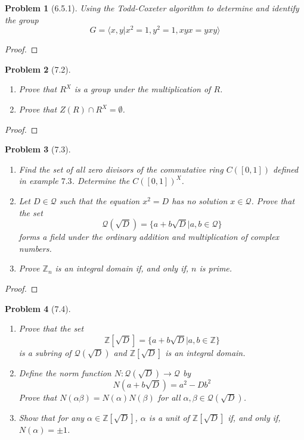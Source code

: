 \documentclass[10pt]{article}
\newcommand{\sk}{\vskip 10mm}
\newcommand{\bb}[1]{\mathbb{#1}}
\theoremstyle{plain}
\newtheorem{problem}{Problem}
\theoremstyle{remark}
\begin{document}
\begin{problem}[6.5.1]
  Using the Todd-Coxeter algorithm to determine and identify the group
  \[ G = \langle x,y| x^2=1,y^2=1, xyx=yxy\rangle \]
\end{problem}

\begin{proof}
  
\end{proof}

\sk

\begin{problem}[7.2]
  \begin{enumerate}
  \item Prove that $R^X$ is a group under the multiplication of $R$.
  \item Prove that $Z(R)\cap R^X=\emptyset$.
  \end{enumerate}
\end{problem}

\begin{proof}
  
\end{proof}

\sk

\begin{problem}[7.3]
  \begin{enumerate}
  \item Find the set of all zero divisors of the commutative ring $C([0,1])$
    defined in example $7.3$. Determine the $C([0,1])^X$.
  \item Let $D\in\mathcal{Q}$ such that the equation $x^2=D$ has no solution
    $x\in\mathcal{Q}$. Prove that the set
    \[ \mathcal{Q}(\sqrt{D})=\{a+b\sqrt{D}|a,b\in\mathcal{Q}\}\]
    forms a field under the ordinary addition and multiplication of
    complex numbers.
   \item Prove $\bb{Z}_n$ is an integral domain if, and only if, $n$ is prime.
  \end{enumerate}
\end{problem}

\begin{proof}
  
\end{proof}

\sk

\begin{problem}[7.4]
  \begin{enumerate}
  \item Prove that the set
    \[ \bb{Z}[\sqrt{D}]=\{a+b\sqrt{D}|a,b\in\bb{Z}\}\]
    is a subring of $\mathcal{Q}(\sqrt{D})$ and
    $\bb{Z}[\sqrt{D}]$ is an integral domain.
  \item Define the norm function $N:\mathcal{Q}(\sqrt{D})\rightarrow\mathcal{Q}$ by
    \[ N(a+b\sqrt{D})=a^2-Db^2\]
    Prove that $N(\alpha\beta)=N(\alpha)N(\beta)$ for all $\alpha,\beta\in\mathcal{Q}(\sqrt{D})$.
  \item Show that for any $\alpha\in\bb{Z}[\sqrt{D}]$, $\alpha$ is a unit of
    $\bb{Z}[\sqrt{D}]$ if, and only if, $N(\alpha)=\pm 1$.
  \end{enumerate}
\end{problem}
\end{document}
